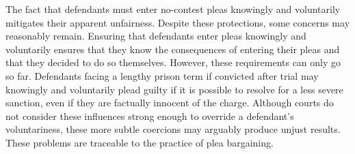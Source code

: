 The fact that defendants must enter no-contest pleas knowingly and voluntarily mitigates their apparent unfairness. Despite these protections, some concerns may reasonably remain. Ensuring that defendants enter pleas knowingly and voluntarily ensures that they know the consequences of entering their pleas and that they decided to do so themselves. However, these requirements can only go so far. Defendants facing a lengthy prison term if convicted after trial may knowingly and voluntarily plead guilty if it is possible to resolve for a less severe sanction, even if they are factually innocent of the charge. Although courts do not consider these influences strong enough to override a defendant's voluntariness, these more subtle coercions may arguably produce unjust results. These problems are traceable to the practice of plea bargaining.
